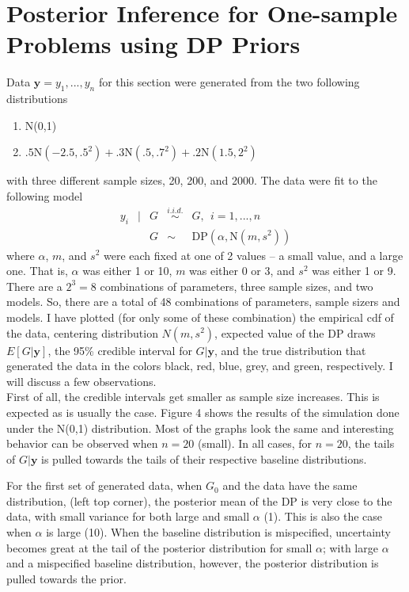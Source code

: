 \documentclass{article}
\begin{document}
\section{Posterior Inference for One-sample Problems using DP Priors}
Data $\mathbf y = y_1,...,y_n$ for this section were generated from 
the two following distributions
\begin{enumerate}
  \item N(0,1) 
  \item $.5$N$(-2.5, .5^2 ) + .3$N$(.5, .7^2 ) + .2$N$(1.5, 2^2 )$\\
\end{enumerate}
with three different sample sizes, 20, 200, and 2000. The data were fit 
to the following model
\[
  \begin{array}{rclcl}
    y_i &|& G &\overset{i.i.d.}{\sim}& G,~~ i = 1, ..., n \\
        &&  G &\sim& \text{DP}(\alpha, \text{N}(m,s^2) )
  \end{array}
\]
where $\alpha$, $m$, and $s^2$ were each fixed at one of 2 values -- a small
value, and a large one. That is, $\alpha$ was either 1 or 10, $m$ was either 0
or 3, and $s^2$ was either 1 or 9. There are a $2^3=8$ combinations of
parameters, three sample sizes, and two models. So, there are a total of 48
combinations of parameters, sample sizers and models. I have plotted (for only
some of these combination) the empirical cdf of the data, centering
distribution $N(m,s^2)$, expected value of the DP draws $E[G|\mathbf y]$, the
95\% credible interval for $G|\mathbf y$, and the true distribution that
generated the data in the colors black, red, blue, grey, and green,
respectively. I will discuss a few observations. \\

\noindent
First of all, the credible intervals get smaller as sample size increases. This
is expected as is usually the case. Figure 4 shows the results of the
simulation done under the N(0,1) distribution. Most of the graphs look the same
and interesting behavior can be observed when $n=20$ (small). In all cases, for
$n=20$, the tails of $G|\mathbf y$ is pulled towards the tails of their
respective baseline distributions. 

\noindent
For the first set of generated data, when $G_0$ and the data have the same
distribution, (left top corner), the posterior mean of the DP is very close to
the data, with small variance for both large and small $\alpha$ (1). This is also
the case when $\alpha$ is large (10). When the baseline distribution is mispecified,
uncertainty becomes great at the tail of the posterior distribution for small $\alpha$;
with large $\alpha$ and a mispecified baseline distribution, however, the posterior
distribution is pulled towards the prior.\\
\end{document}
